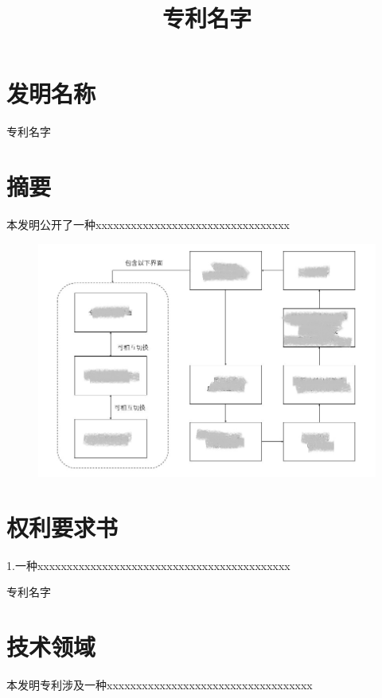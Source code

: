 \documentclass[12pt]{article}
\title{专利名字}
\date{} %
\begin{document}
\captionsetup{labelformat=default,labelsep=space} %

\section*{发明名称}
专利名字

\section*{摘要}
本发明公开了一种xxxxxxxxxxxxxxxxxxxxxxxxxxxxxxxxx

\hspace{2cm}
\begin{figure}[hbt]
	\centering
	\includegraphics[width=16cm]{功能框图v2.jpg}
\end{figure}

\newpage
\section*{权利要求书}
1.一种xxxxxxxxxxxxxxxxxxxxxxxxxxxxxxxxxxxxxxxxxxx

\newpage

\begin{center}
	\LARGE{专利名字}
\end{center}

\section*{技术领域}%
本发明专利涉及一种xxxxxxxxxxxxxxxxxxxxxxxxxxxxxxxxxxx
\end{document}
